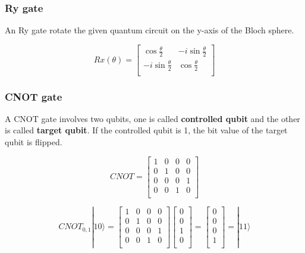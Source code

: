 \subsubsection{Ry gate}

 An Ry gate rotate the given quantum circuit on the y-axis of the Bloch sphere.
 
 $$ Rx(\theta) = \begin{bmatrix}
\cos{\frac{\theta}{2}} & -i\sin{\frac{\theta}{2}} \\
 -i\sin{\frac{\theta}{2}} & \cos{\frac{\theta}{2}}  \\
\end{bmatrix}
$$
\subsubsection{CNOT gate}

A CNOT gate involves two qubits, one is called \textbf{controlled qubit} and the other is called \textbf{target qubit}.  If the controlled qubit is 1, the bit value of the target qubit is flipped.

$$ CNOT = \begin{bmatrix}
1 & 0 & 0 & 0 \\
0 & 1 & 0 & 0 \\
0 & 0 & 0 & 1 \\
0 & 0 & 1 & 0 \\
\end{bmatrix}
$$

$$CNOT_{0,1}|10\rangle = 
\begin{bmatrix}
1 & 0 & 0 & 0 \\
0 & 1 & 0 & 0 \\
0 & 0 & 0 & 1 \\
0 & 0 & 1 & 0 \\
\end{bmatrix}
 \left[
\begin{array}{c}
0 \\
0 \\
1 \\
0 \\
\end{array}
\right]
=  \left[
\begin{array}{c}
0 \\
0 \\
0 \\
1 \\
\end{array}
\right] 
= |11\rangle 
$$

